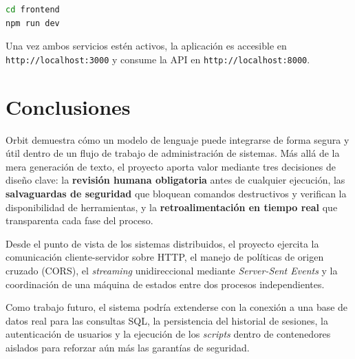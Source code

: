 \documentclass[12pt,a4paper]{article}
\begin{document}
\begin{lstlisting}[language=bash]
cd frontend
npm run dev
\end{lstlisting}

Una vez ambos servicios estén activos, la aplicación es accesible en
\texttt{http://localhost:3000} y consume la API en
\texttt{http://localhost:8000}.

\section{Conclusiones}

Orbit demuestra cómo un modelo de lenguaje puede integrarse de forma segura y
útil dentro de un flujo de trabajo de administración de sistemas. Más allá de la
mera generación de texto, el proyecto aporta valor mediante tres decisiones de
diseño clave: la \textbf{revisión humana obligatoria} antes de cualquier
ejecución, las \textbf{salvaguardas de seguridad} que bloquean comandos
destructivos y verifican la disponibilidad de herramientas, y la
\textbf{retroalimentación en tiempo real} que transparenta cada fase del
proceso.

Desde el punto de vista de los sistemas distribuidos, el proyecto ejercita la
comunicación cliente-servidor sobre HTTP, el manejo de políticas de origen
cruzado (CORS), el \textit{streaming} unidireccional mediante \textit{Server-Sent
Events} y la coordinación de una máquina de estados entre dos procesos
independientes.

Como trabajo futuro, el sistema podría extenderse con la conexión a una base de
datos real para las consultas SQL, la persistencia del historial de sesiones, la
autenticación de usuarios y la ejecución de los \textit{scripts} dentro de
contenedores aislados para reforzar aún más las garantías de seguridad.
\end{document}
